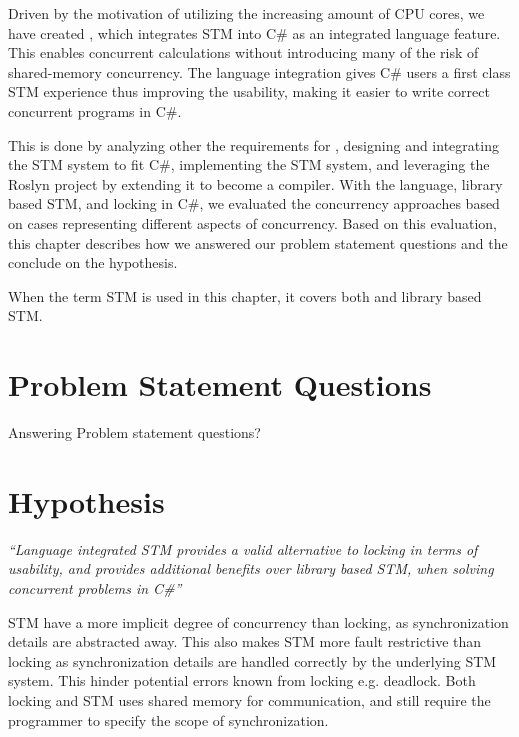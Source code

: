 \makeatletter {}\makeatother
{}
Driven by the motivation of utilizing the increasing amount of \ac{CPU} cores, we have created \stmname, which integrates \ac{STM} into C\# as an integrated language feature. This enables concurrent calculations without introducing many of the risk of shared-memory concurrency. The language integration gives C\# users a first class \ac{STM} experience thus improving the usability, making it easier to write correct concurrent programs in C\#. 

This is done by analyzing other the requirements for \stmname, designing and integrating the \ac{STM} system to fit C\#, implementing the \ac{STM} system, and leveraging the Roslyn project by extending it to become a \stmname compiler. With the \stmname language, library based \ac{STM}, and locking in C\#, we evaluated the concurrency approaches based on cases representing different aspects of concurrency. Based on this evaluation, this chapter describes how we answered our problem statement questions and the conclude on the hypothesis. 

When the term \ac{STM} is used in this chapter, it covers both \stmname and library based \ac{STM}. 



\label{chap:conclusion}

\section{Problem Statement Questions}
Answering Problem statement questions?

\section{Hypothesis}
\textit{``Language integrated \ac{STM} provides a valid alternative to locking in terms of usability, and provides additional benefits over library based \ac{STM}, when solving concurrent problems in C\#''}

\ac{STM} have a more implicit degree of concurrency than locking, as synchronization details are abstracted away. This also makes \ac{STM} more fault restrictive than locking as synchronization details are handled correctly by the underlying \ac{STM} system. This hinder potential errors known from locking e.g. deadlock. Both locking and \ac{STM} uses shared memory for communication, and still require the programmer to specify the scope of synchronization.


